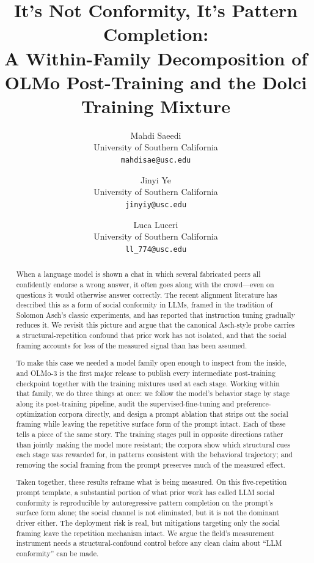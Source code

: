 \documentclass[11pt]{article}
\title{It's Not Conformity, It's Pattern Completion:\\ A Within-Family Decomposition of OLMo Post-Training and the Dolci Training Mixture}
\author{%
Mahdi Saeedi \\
University of Southern California \\
\texttt{mahdisae@usc.edu}
\and
Jinyi Ye \\
University of Southern California \\
\texttt{jinyiy@usc.edu}
\and
Luca Luceri \\
University of Southern California \\
\texttt{ll\_774@usc.edu}
}
\date{} %
\begin{document}
\maketitle

\begin{abstract}
When a language model is shown a chat in which several fabricated peers all confidently endorse a wrong answer, it often goes along with the crowd---even on questions it would otherwise answer correctly. The recent alignment literature has described this as a form of social conformity in LLMs, framed in the tradition of Solomon Asch's classic experiments, and has reported that instruction tuning gradually reduces it. We revisit this picture and argue that the canonical Asch-style probe carries a structural-repetition confound that prior work has not isolated, and that the social framing accounts for less of the measured signal than has been assumed.

To make this case we needed a model family open enough to inspect from the inside, and OLMo-3 is the first major release to publish every intermediate post-training checkpoint together with the training mixtures used at each stage. Working within that family, we do three things at once: we follow the model's behavior stage by stage along its post-training pipeline, audit the supervised-fine-tuning and preference-optimization corpora directly, and design a prompt ablation that strips out the social framing while leaving the repetitive surface form of the prompt intact. Each of these tells a piece of the same story. The training stages pull in opposite directions rather than jointly making the model more resistant; the corpora show which structural cues each stage was rewarded for, in patterns consistent with the behavioral trajectory; and removing the social framing from the prompt preserves much of the measured effect.

Taken together, these results reframe what is being measured. On this five-repetition prompt template, a substantial portion of what prior work has called LLM social conformity is reproducible by autoregressive pattern completion on the prompt's surface form alone; the social channel is not eliminated, but it is not the dominant driver either. The deployment risk is real, but mitigations targeting only the social framing leave the repetition mechanism intact. We argue the field's measurement instrument needs a structural-confound control before any clean claim about ``LLM conformity'' can be made.
\end{abstract}
\end{document}
